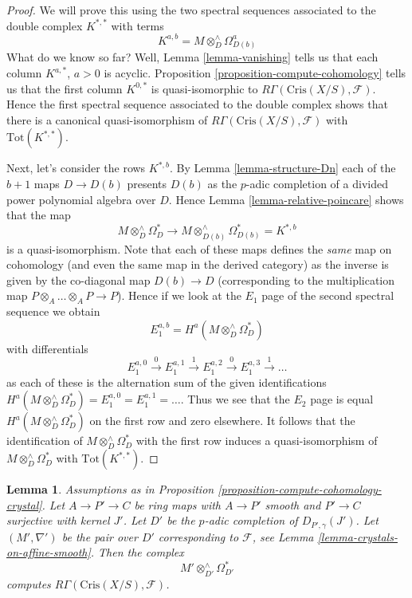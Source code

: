 \documentclass{stacks-project}
\theoremstyle{plain}
\newtheorem{lemma}[subsection]{Lemma}
\theoremstyle{definition}
\theoremstyle{remark}
\numberwithin{equation}{subsection}
\begin{document}
\begin{proof}
We will prove this using the two spectral sequences associated to the
double complex $K^{*, *}$ with terms
$$
K^{a, b} = M \otimes_D^\wedge \Omega^a_{D(b)}
$$
What do we know so far? Well, Lemma \ref{lemma-vanishing}
tells us that each column $K^{a, *}$, $a > 0$ is acyclic.
Proposition \ref{proposition-compute-cohomology} tells us that
the first column $K^{0, *}$ is quasi-isomorphic to
$R\Gamma(\text{Cris}(X/S), \mathcal{F})$.
Hence the first spectral sequence associated to the double complex
shows that there is a canonical quasi-isomorphism of
$R\Gamma(\text{Cris}(X/S), \mathcal{F})$ with
$\text{Tot}(K^{*, *})$.

\medskip\noindent
Next, let's consider the rows $K^{*, b}$. By
Lemma \ref{lemma-structure-Dn}
each of the $b + 1$ maps $D \to D(b)$ presents $D(b)$ as the $p$-adic
completion of a divided power polynomial algebra over $D$.
Hence Lemma \ref{lemma-relative-poincare} shows that the map
$$
M \otimes^\wedge_D\Omega^*_D
\longrightarrow
M \otimes^\wedge_{D(b)} \Omega^*_{D(b)} = K^{*, b}
$$
is a quasi-isomorphism. Note that each of these maps defines the {\it same}
map on cohomology (and even the same map in the derived category) as
the inverse is given by the co-diagonal map $D(b) \to D$ (corresponding
to the multiplication map $P \otimes_A \ldots \otimes_A P \to P$).
Hence if we look at the $E_1$ page of the second spectral sequence
we obtain
$$
E_1^{a, b} = H^a(M \otimes^\wedge_D\Omega^*_D)
$$
with differentials
$$
E_1^{a, 0} \xrightarrow{0}
E_1^{a, 1} \xrightarrow{1}
E_1^{a, 2} \xrightarrow{0}
E_1^{a, 3} \xrightarrow{1} \ldots
$$
as each of these is the alternation sum of the given identifications
$H^a(M \otimes^\wedge_D\Omega^*_D) = E_1^{a, 0} = E_1^{a, 1} = \ldots$.
Thus we see that the $E_2$ page is equal $H^a(M \otimes^\wedge_D\Omega^*_D)$
on the first row and zero elsewhere. It follows that the identification
of $M \otimes^\wedge_D\Omega^*_D$ with the first row induces a
quasi-isomorphism of $M \otimes^\wedge_D\Omega^*_D$ with
$\text{Tot}(K^{*, *})$.
\end{proof}

\begin{lemma}
\label{lemma-compute-cohomology-crystal-smooth}
Assumptions as in Proposition \ref{proposition-compute-cohomology-crystal}.
Let $A \to P' \to C$ be ring maps with $A \to P'$ smooth and $P' \to C$
surjective with kernel $J'$. Let $D'$ be the $p$-adic completion of
$D_{P', \gamma}(J')$. Let $(M', \nabla')$ be the pair over $D'$
corresponding to $\mathcal{F}$, see
Lemma \ref{lemma-crystals-on-affine-smooth}. Then the complex
$$
M' \otimes^\wedge_{D'} \Omega^*_{D'}
$$
computes $R\Gamma(\text{Cris}(X/S), \mathcal{F})$.
\end{lemma}
\end{document}
